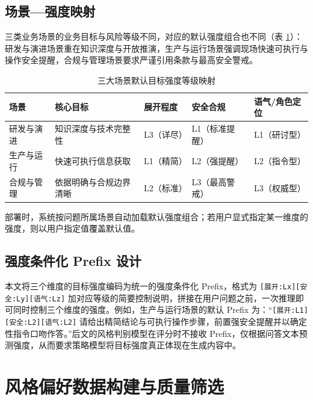 \documentclass[fontset=fandol,type=master,campus=shenzhen,etitleauto=true]{hithesisbook}
\begin{document}
\subsection{场景---强度映射}\label{ux573aux666fux5f3aux5ea6ux6620ux5c04}

三类业务场景的业务目标与风险等级不同，对应的默认强度组合也不同（表 \ref{tab:scene-intensity-map}）：研发与演进场景重在知识深度与开放推演，生产与运行场景强调现场快速可执行与操作安全提醒，合规与管理场景要求严谨引用条款与最高安全警戒。

\begin{table}[htbp]
\centering
\caption{三大场景默认目标强度等级映射}
\label{tab:scene-intensity-map}
\small
\renewcommand{\arraystretch}{1.1}
\begin{tabular}{p{2.2cm}p{3.0cm}p{1.6cm}p{2.4cm}p{2.6cm}}
\toprule
\textbf{场景} & \textbf{核心目标} & \textbf{展开程度} & \textbf{安全合规} & \textbf{语气/角色定位} \\
\midrule
研发与演进 & 知识深度与技术完整性 & L3（详尽） & L1（标准提醒） & L1（研讨型） \\
生产与运行 & 快速可执行信息获取 & L1（精简） & L2（强提醒） & L2（指令型） \\
合规与管理 & 依据明确与合规边界清晰 & L2（标准） & L3（最高警戒） & L3（权威型） \\
\bottomrule
\end{tabular}
\end{table}

部署时，系统按问题所属场景自动加载默认强度组合；若用户显式指定某一维度的强度，则以用户指定值覆盖默认值。

\subsection{强度条件化 Prefix 设计}\label{ux5f3aux5ea6ux6761ux4ef6ux5316-prefix-ux8bbeux8ba1}

本文将三个维度的目标强度编码为统一的强度条件化 Prefix，格式为 \texttt{[展开:Lx][安全:Ly][语气:Lz]} 加对应等级的简要控制说明，拼接在用户问题之前，一次推理即可同时控制三个维度的强度。例如，生产与运行场景的默认 Prefix 为：“\texttt{[展开:L1][安全:L2][语气:L2]} 请给出精简结论与可执行操作步骤，前置强安全提醒并以确定性指令口吻作答。”后文的风格判别模型在评分时不接收 Prefix，仅根据问答文本预测强度，从而要求策略模型将目标强度真正体现在生成内容中。

\section{风格偏好数据构建与质量筛选}\label{ux98ceux683cux504fux597dux6570ux636eux6784ux5efaux4e0e-llm-as-judge-ux7b5bux9009}
\end{document}

